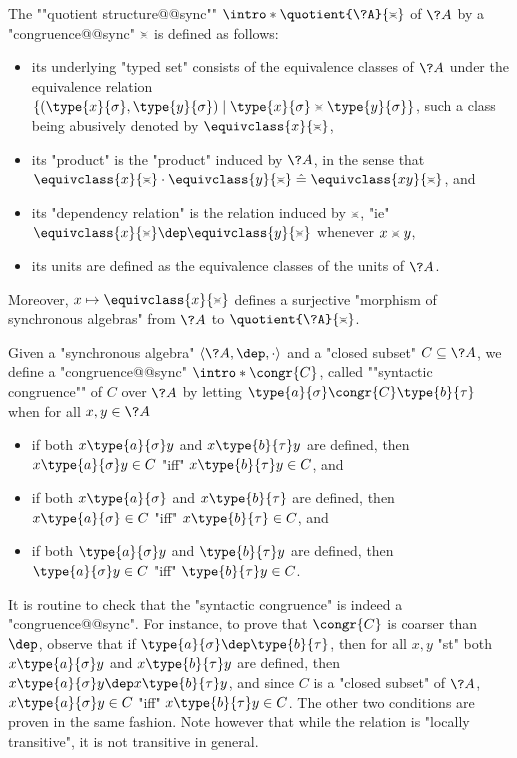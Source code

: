 The \AP""quotient structure@@sync"" $\intro*\quotient{\?A}{\asympbar}$
of $\?A$ by a "congruence@@sync" $\asympbar$ is defined as follows:
\begin{itemize}
	\item its underlying "typed set" consists of the
		equivalence classes of $\?A$ under the equivalence relation
		$\{(\type{x}{\sigma}, \type{y}{\sigma}) \mid \type{x}{\sigma} \asympbar \type{y}{\sigma}\}$,
		such a class being abusively denoted by $\equivclass{x}{\asympbar}$,
	\item its "product" is the "product" induced by $\?A$, in the sense
		that $\equivclass{x}{\asympbar}\cdot \equivclass{y}{\asympbar} \defeq \equivclass{xy}{\asympbar}$, and
	\item its "dependency relation" is the relation induced by $\asympbar$,
		"ie" $\equivclass{x}{\asympbar}\dep \equivclass{y}{\asympbar}$ whenever $x \asympbar y$,
	\item its units are defined as the equivalence classes of the units of $\?A$.
\end{itemize}
Moreover, $x \mapsto \equivclass{x}{\asympbar}$ defines a surjective
"morphism of synchronous algebras" from $\?A$ to $\quotient{\?A}{\asympbar}$.

Given a "synchronous algebra" $\langle \?A, \dep, \cdot \rangle$
and a "closed subset" $C \subseteq \?A$, 
we define a "congruence@@sync" \AP$\intro*\congr{C}$, called
\AP""syntactic congruence"" of $C$ over $\?A$ by letting
$\type{a}{\sigma} \congr{C} \type{b}{\tau}$ when for all $x, y \in \?A$
\begin{itemize}
	\item if both
		$x \type{a}{\sigma} y$
		and $x \type{b}{\tau} y$ are defined,
		then $x \type{a}{\sigma} y \in C$
		"iff" $x \type{b}{\tau} y \in C$, and
	\item if both
		$x \type{a}{\sigma}$
		and $x \type{b}{\tau}$ are defined,
		then $x \type{a}{\sigma} \in C$
		"iff" $x \type{b}{\tau} \in C$, and
	\item if both $\type{a}{\sigma} y$
		and $\type{b}{\tau} y$ are defined,
		then $\type{a}{\sigma} y \in C$
		"iff" $\type{b}{\tau} y \in C$.
\end{itemize}
It is routine to check that the "syntactic congruence" is indeed a "congruence@@sync".
For instance, to prove that $\congr{C}$ is coarser than $\dep$, observe that
if $\type{a}{\sigma} \dep \type{b}{\tau}$, then
for all $x, y$ "st" both $x \type{a}{\sigma} y$
and $x \type{b}{\tau} y$ are defined, then $x \type{a}{\sigma} y \dep x \type{b}{\tau} y$,
and since $C$ is a "closed subset" of $\?A$, $x \type{a}{\sigma} y \in C$ "iff"
$x \type{b}{\tau} y \in C$. The other two conditions are proven in the same fashion.
Note however that while the relation is "locally transitive", it is not
transitive in general.

